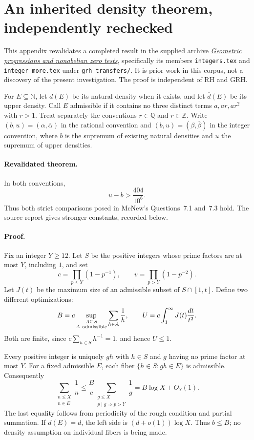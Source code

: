 \section{An inherited density theorem, independently rechecked}
\label{app:density-audit}

This appendix revalidates a completed result in the supplied archive
\href{https://github.com/VladimirReshetnikov/ProveIt/blob/5cc267af75a635199ac5d93a7d49cbce521daefc/docs/incoming/grh_transfers_density_gaps_and_zero_tests.zip}{\emph{Geometric progressions and nonabelian zero tests}},
specifically its members \texttt{integers.tex} and \texttt{integer\_more.tex}
under \texttt{grh\_transfers/}. It is prior work in this corpus, not a discovery
of the present investigation. The proof is independent of RH and GRH.

For $E\subseteq\mathbb N$, let $d(E)$ be its natural density when it exists,
and let $\overline d(E)$ be its upper density. Call $E$ admissible if it
contains no three distinct terms $a,ar,ar^2$ with $r>1$. Treat separately
the conventions $r\in\mathbb Q$ and $r\in\mathbb Z$. Write
$(b,u)=(\alpha,\overline\alpha)$ in the rational convention and
$(b,u)=(\beta,\overline\beta)$ in the integer convention, where $b$ is the
supremum of existing natural densities and $u$ the supremum of upper densities.

\paragraph{Revalidated theorem.}
In both conventions,
\[
                         u-b>\frac{404}{10^6}.
\]
Thus both strict comparisons posed in McNew's Questions~7.1 and~7.3 hold.
The source report gives stronger constants, recorded below.

\paragraph{Proof.}
Fix an integer $Y\ge12$. Let $S$ be the positive integers whose prime factors
are at most $Y$, including $1$, and set
\[
 c=\prod_{p\le Y}(1-p^{-1}),\qquad
 v=\prod_{p>Y}(1-p^{-2}).
\]
Let $J(t)$ be the maximum size of an admissible subset of $S\cap[1,t]$.
Define two different optimizations:
\[
 B=c\sup_{\substack{A\subseteq S\\A\ {\rm admissible}}}
       \sum_{h\in A}\frac1h,
 \qquad
 U=c\int_1^\infty J(t)\frac{dt}{t^2}.
\]
Both are finite, since
$c\sum_{h\in S}h^{-1}=1$, and hence $U\le1$.

Every positive integer is uniquely $gh$ with $h\in S$ and $g$ having no prime
factor at most $Y$. For a fixed admissible $E$, each fiber
$\{h\in S:gh\in E\}$ is admissible. Consequently
\[
 \sum_{\substack{n\le X\\n\in E}}\frac1n
 \le \frac Bc\sum_{\substack{g\le X\\p\mid g\Rightarrow p>Y}}\frac1g
 =B\log X+O_Y(1).
\]
The last equality follows from periodicity of the rough condition and partial
summation. If $d(E)=d$, the left side is $(d+o(1))\log X$. Thus $b\le B$;
no density assumption on individual fibers is being made.

